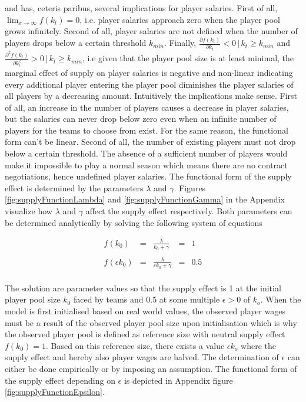 \documentclass[12pt, a4paper]{article}
\begin{document}
\noindent
and has, ceteris paribus, several implications for player salaries. First of all, $\lim_{x\to\infty}f(k_t) = 0$, i.e. player salaries approach zero when the player pool grows infinitely. Second of all, player salaries are not defined when the number of players drops below a certain threshold $k_{min}$. Finally, $\frac{\partial f(k_t)}{\partial k_t}<0 \,|\, k_t \geq k_{min}$ and $\frac{\partial^2 f(k_t)}{\partial k_t^2}>0 \,|\, k_t \geq k_{min}$, i.e given that the player pool size is at least minimal, the marginal effect of supply on player salaries is negative and non-linear indicating every additional player entering the player pool diminishes the player salaries of all players by a decreasing amount. Intuitively the implications make sense. First of all, an increase in the number of players causes a decrease in player salaries, but the salaries can never drop below zero even when an infinite number of players for the teams to choose from exist. For the same reason, the functional form can't be linear. Second of all, the number of existing players must not drop below a certain threshold. The absence of a sufficient number of players would make it impossible to play a normal season which means there are no contract negotiations, hence undefined player salaries. The functional form of the supply effect is determined by the parameters $\lambda$ and $\gamma$. Figures \ref{fig:supplyFunctionLambda} and \ref{fig:supplyFunctionGamma} in the Appendix visualize how $\lambda$ and $\gamma$ affect the supply effect respectively. Both parameters can be determined analytically by solving the following system of equations

\begin{equation}
\label{eq:solvingSupplyEffect}
\begin{array}{ccccc}
f(k_0) & = &\frac{\lambda}{k_0+\gamma}& = & 1 \\
\\
f(\epsilon k_0) & = &\frac{\lambda}{\epsilon k_0+\gamma}& = & 0.5 \\
\end{array}
\end{equation}

\noindent
 The solution are parameter values so that the supply effect is 1 at the initial player pool size $k_0$ faced by teams and 0.5 at some multiple $\epsilon>0$ of $k_o$. When the model is first initialised based on real world values, the observed player wages must be a result of the observed player pool size upon initialisation which is why the observed player pool is defined as reference size with neutral supply effect $f(k_0)=1$. Based on this reference size, there exists a value $\epsilon k_o$ where the supply effect and hereby also player wages are halved. The determination of $\epsilon$ can either be done empirically or by imposing an assumption. The functional form of the supply effect depending on $\epsilon$ is depicted in Appendix figure \ref{fig:supplyFunctionEpsilon}. 
\end{document}
